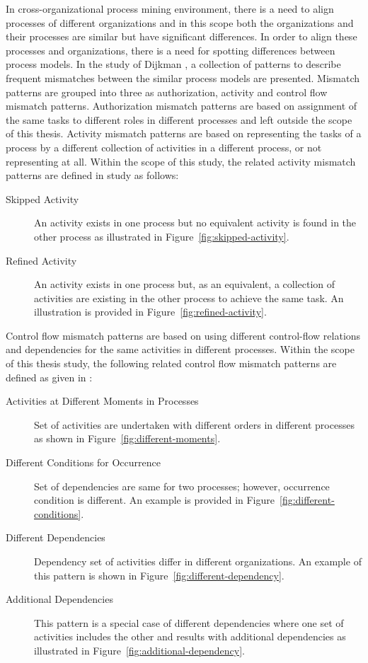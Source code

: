 In cross-organizational process mining environment, there is a need to align processes of different organizations and in this scope both the organizations and their processes are similar but have significant differences. In order to align these processes and organizations, there is a need for spotting differences between process models. In the study of Dijkman \cite{dijkman2007mismatch}, a collection of patterns to describe frequent mismatches between the similar process models are presented. Mismatch patterns are grouped into three as authorization, activity and control flow mismatch patterns. Authorization mismatch patterns are based on assignment of the same tasks to different roles in different processes and left outside the scope of this thesis. Activity mismatch patterns are based on representing the tasks of a process by a different collection of activities in a different process, or not representing at all. Within the scope of this study, the related activity mismatch patterns are defined in study \cite{dijkman2007mismatch} as follows:
\begin{description}
  \item[Skipped Activity] An activity exists in one process but no equivalent activity is found in the other process as illustrated in Figure~\ref{fig:skipped-activity}.
  \item[Refined Activity] An activity exists in one process but, as an equivalent, a collection of activities are existing in the other process to achieve the same task. An illustration is provided in Figure~\ref{fig:refined-activity}. 
\end{description}

Control flow mismatch patterns are based on using different control-flow relations and dependencies for the same activities in different processes. Within the scope of this thesis study, the following related control flow mismatch patterns are defined as given in \cite{dijkman2007mismatch}:
\begin{description}
  \item[Activities at Different Moments in Processes] Set of activities are undertaken with different orders in different processes as shown in Figure~\ref{fig:different-moments}. 
  \item[Different Conditions for Occurrence] Set of dependencies are same for two processes; however, occurrence condition is different. An example is provided in Figure~\ref{fig:different-conditions}.
  \item[Different Dependencies] Dependency set of activities differ in different organizations. An example of this pattern is shown in Figure~\ref{fig:different-dependency}.
  \item[Additional Dependencies] This pattern is a special case of different dependencies where one set of activities includes the other and results with additional dependencies as illustrated in Figure~\ref{fig:additional-dependency}.
\end{description}

